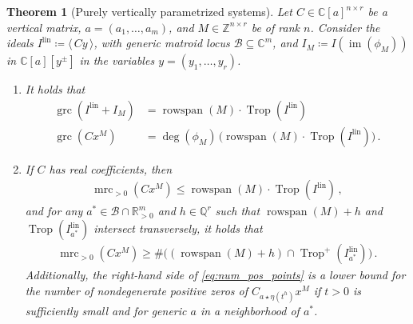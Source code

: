 \documentclass[11pt,reqno,a4paper]{amsart}
\numberwithin{equation}{section}
\theoremstyle{theoremstyle}
\newtheorem{theorem}{Theorem}[section]
\theoremstyle{examplestyle}
\newcommand{\CC}{\mathbb{C}}
\newcommand{\RR}{\mathbb{R}}
\newcommand{\QQ}{\mathbb{Q}}
\newcommand{\lin}{{\mathrm{lin}}}
\DeclareMathOperator{\grc}{grc}
\DeclareMathOperator{\mrc}{mrc}
\DeclareMathOperator{\rowspan}{rowspan}
\DeclareMathOperator{\im}{im}
\DeclareMathOperator{\Trop}{Trop}
\begin{document}
\begin{theorem}[Purely vertically parametrized systems]
\label{thm:bound_purevertical}
Let $C \in \mathbb{C}[a]^{n \times r}$ be   a vertical matrix, $a=(a_1,\dots,a_m)$, and $M \in \mathbb{Z}^{n \times r}$ be of rank $n$. Consider the ideals $I^{\lin} \coloneqq \langle\,C y\,\rangle$, with generic matroid locus $\mathcal{B}\subseteq\CC^m$, and $I_M\coloneqq I(\im(\phi_M))$ in $\CC[a][y^\pm]$ in the variables $y=(y_1,\dots,y_r)$. 
\begin{enumerate}[label=(\roman*)]
    \item  It holds that 
\begin{align*}
\grc ( I^{\lin} + I_M  ) &= \rowspan(M)\cdot \Trop(I^{\lin} )\, \\
\grc(C x^M  ) &=  \deg(\phi_M) \, \big(\rowspan(M)\cdot \Trop(I^{\lin})\big)\, .
\end{align*}
\item If $C$ has real coefficients, then 
\begin{align}
\label{eq:max_num_pos_points} \mrc_{>0}(C  x^M ) \leq  \rowspan(M)\cdot \Trop(I^{\lin})  \,, 
\end{align}
and  for  any $a^*\in \mathcal{B}\cap\RR^m_{>0}$
and $h\in\QQ^r$ such that 
$\rowspan(M)+h$ and $\Trop(I^{\lin}_{a^*})$ intersect transversely, it holds that
\begin{align}
\label{eq:num_pos_points} 
\mrc_{>0}(C x^M) \geq \# \big((\rowspan(M)+h)\cap \Trop^+(I^{\lin}_{a^*})\big)\, .
\end{align}
Additionally, the right-hand side of \eqref{eq:num_pos_points} is a lower bound for the number of nondegenerate positive zeros of $C_{a\star \eta(t^h)} x^M$ if $t>0$ is sufficiently small and for generic $a$ in a neighborhood of $a^*$. 
\end{enumerate}
\end{theorem}
\end{document}

